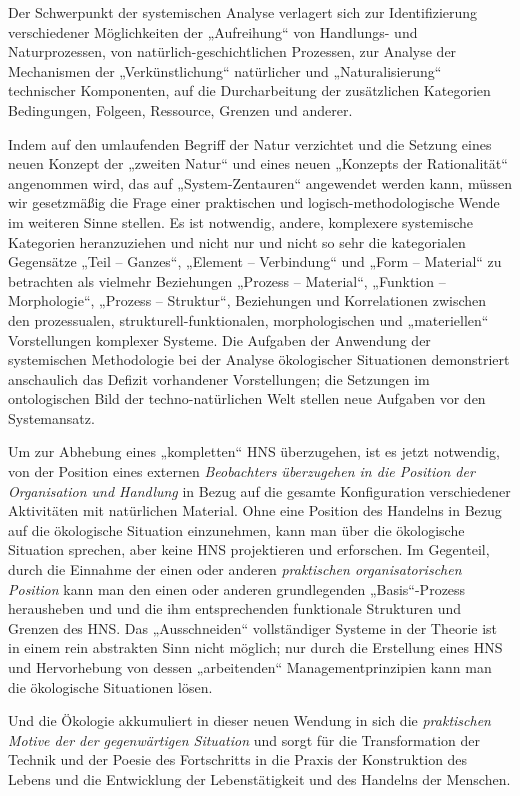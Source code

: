 \documentclass[11pt,a4paper]{article}
\begin{document}
Der Schwerpunkt der systemischen Analyse verlagert sich zur Identifizierung
verschiedener Möglichkeiten der „Aufreihung“ von Handlungs- und
Naturprozessen, von natürlich-geschichtlichen Prozessen, zur Analyse der
Mechanismen der „Verkünstlichung“ natürlicher und „Naturalisierung“
technischer Komponenten, auf die Durcharbeitung der zusätzlichen Kategorien
Bedingungen, Folgeen, Ressource, Grenzen und anderer.

Indem auf den umlaufenden Begriff der Natur verzichtet und die Setzung eines
neuen Konzept der „zweiten Natur“ und eines neuen „Konzepts der Rationalität“
angenommen wird, das auf „System-Zentauren“ angewendet werden kann, müssen wir
gesetzmäßig die Frage einer praktischen und logisch-methodologische Wende im
weiteren Sinne stellen. Es ist notwendig, andere, komplexere systemische
Kategorien heranzuziehen und nicht nur und nicht so sehr die kategorialen
Gegensätze „Teil -- Ganzes“, „Element -- Verbindung“ und „Form -- Material“ zu
betrachten als vielmehr Beziehungen „Prozess -- Material“, „Funktion --
Morphologie“, „Prozess -- Struktur“, Beziehungen und Korrelationen zwischen
den prozessualen, strukturell-funktionalen, morphologischen und „materiellen“
Vorstellungen komplexer Systeme. Die Aufgaben der Anwendung der systemischen
Methodologie bei der Analyse ökologischer Situationen demonstriert anschaulich
das Defizit vorhandener Vorstellungen; die Setzungen im ontologischen Bild der
techno-natürlichen Welt stellen neue Aufgaben vor den Systemansatz.

Um zur Abhebung eines „kompletten“ HNS überzugehen, ist es jetzt notwendig,
von der Position eines externen \emph{Beobachters überzugehen in die Position
  der Organisation und Handlung} in Bezug auf die gesamte Konfiguration
verschiedener Aktivitäten mit natürlichen Material. Ohne eine Position des
Handelns in Bezug auf die ökologische Situation einzunehmen, kann man über die
ökologische Situation sprechen, aber keine HNS projektieren und erforschen. Im
Gegenteil, durch die Einnahme der einen oder anderen \emph{praktischen
  organisatorischen Position} kann man den einen oder anderen grundlegenden
„Basis“-Prozess herausheben und und die ihm entsprechenden funktionale
Strukturen und Grenzen des HNS. Das „Ausschneiden“ vollständiger Systeme in
der Theorie ist in einem rein abstrakten Sinn nicht möglich; nur durch die
Erstellung eines HNS und Hervorhebung von dessen „arbeitenden“
Managementprinzipien kann man die ökologische Situationen lösen.

Und die Ökologie akkumuliert in dieser neuen Wendung in sich die
\emph{praktischen Motive der der gegenwärtigen Situation} und sorgt für die
Transformation der Technik und der Poesie des Fortschritts in die Praxis der
Konstruktion des Lebens und die Entwicklung der Lebenstätigkeit und des
Handelns der Menschen.
\end{document}
